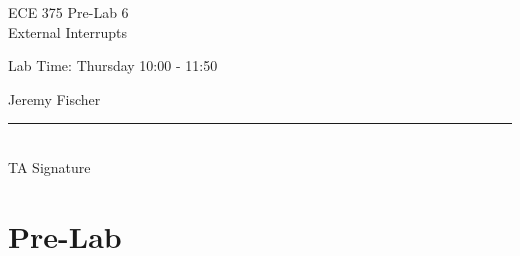 \documentclass[12pt,letterpaper]{article}
\begin{document}
\begin{titlepage}
    \vspace*{4cm}
    \begin{flushright}
    {\huge
        ECE 375 Pre-Lab 6\\[1cm]
    }
    {\large
     	 External Interrupts
    }
    \end{flushright}
    \begin{flushleft}
    Lab Time: Thursday 10:00 - 11:50
    \end{flushleft}
    \begin{flushright}
    Jeremy Fischer
    
    \vfill
    \rule{5in}{.5mm}\\
    TA Signature
    \end{flushright}

\end{titlepage}


\section{Pre-Lab}
\end{document}
